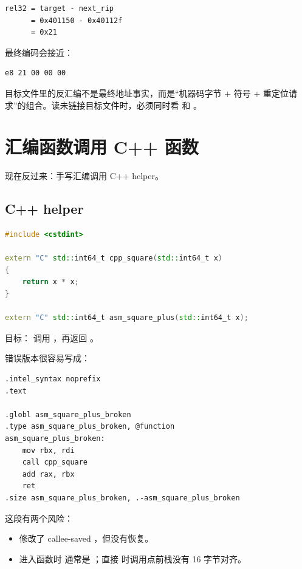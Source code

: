 \begin{lstlisting}
rel32 = target - next_rip
      = 0x401150 - 0x40112f
      = 0x21
\end{lstlisting}

最终编码会接近：

\begin{lstlisting}
e8 21 00 00 00
\end{lstlisting}

\begin{keyidea}
目标文件里的反汇编不是最终地址事实，而是“机器码字节 + 符号 + 重定位请求”的组合。读未链接目标文件时，必须同时看  和 。
\end{keyidea}

\section{汇编函数调用 C++ 函数}

现在反过来：手写汇编调用 C++ helper。

\subsection{C++ helper}

\begin{lstlisting}[language=C++]
#include <cstdint>

extern "C" std::int64_t cpp_square(std::int64_t x)
{
    return x * x;
}

extern "C" std::int64_t asm_square_plus(std::int64_t x);
\end{lstlisting}

目标： 调用 ，再返回 。

错误版本很容易写成：

\begin{lstlisting}
.intel_syntax noprefix
.text

.globl asm_square_plus_broken
.type asm_square_plus_broken, @function
asm_square_plus_broken:
    mov rbx, rdi
    call cpp_square
    add rax, rbx
    ret
.size asm_square_plus_broken, .-asm_square_plus_broken
\end{lstlisting}

这段有两个风险：

\begin{itemize}
  \item 修改了 callee-saved ，但没有恢复。
  \item 进入函数时  通常是 ；直接  时调用点前栈没有 16 字节对齐。
\end{itemize}

